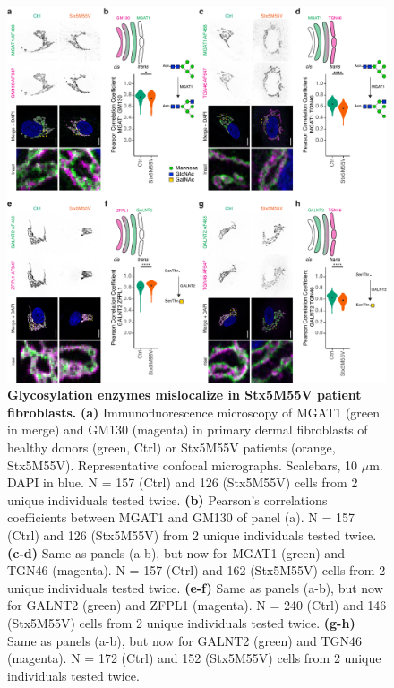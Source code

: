 \begin{figure}
    \includegraphics[keepaspectratio=true,width=\textwidth,height=\textheight]{chapters/chapter6/chapter6_Figure3.pdf}
    \caption{\textbf{Glycosylation enzymes mislocalize in Stx5M55V patient fibroblasts.} \textbf{(a)} Immunofluorescence microscopy of MGAT1 (green in merge) and GM130 (magenta) in primary dermal fibroblasts of healthy donors (green, Ctrl) or Stx5M55V patients (orange, Stx5M55V). Representative confocal micrographs. Scalebars, 10 $\mu$m. DAPI in blue. N = 157 (Ctrl) and 126 (Stx5M55V) cells from 2 unique individuals tested twice. \textbf{(b)} Pearson's correlations coefficients between MGAT1 and GM130 of panel (a). N = 157 (Ctrl) and 126 (Stx5M55V) from 2 unique individuals tested twice. \textbf{(c-d)} Same as panels (a-b), but now for MGAT1 (green) and TGN46 (magenta). N = 157 (Ctrl) and 162 (Stx5M55V) cells from 2 unique individuals tested twice. \textbf{(e-f)} Same as panels (a-b), but now for GALNT2 (green) and ZFPL1 (magenta). N = 240 (Ctrl) and 146 (Stx5M55V) cells from 2 unique individuals tested twice. \textbf{(g-h)} Same as panels (a-b), but now for GALNT2 (green) and TGN46 (magenta). N = 172 (Ctrl) and 152 (Stx5M55V) cells from 2 unique individuals tested twice.}
    \label{fig:ch6fig3}
\end{figure}


